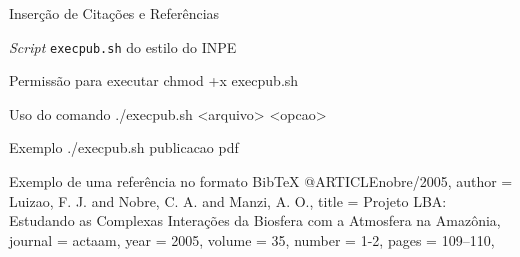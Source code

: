 \documentclass[10pt]{beamer}
\begin{document}
\begin{frame}[fragile]{Inserção de Citações e Referências}
    \begin{block}{\textit{Script} {\tt execpub.sh} do estilo do INPE}
        \vspace{1em}
        \pause
        \begin{meucomandot}{Permissão para executar}
        chmod +x execpub.sh
        \end{meucomandot}
        \pause
        \begin{meucomandot}{Uso do comando}
        ./execpub.sh <arquivo> <opcao>
        \end{meucomandot}    
        \pause
        \begin{meucomandot}{Exemplo}
        ./execpub.sh publicacao pdf
        \end{meucomandot}        
    \end{block}
\end{frame}


\begin{frame}{}
    \begin{meucomandol}{Exemplo de uma referência no formato Bib\TeX{}}
        @ARTICLE{nobre/2005,
          author    = {Luizao, F. J. and Nobre, C. A. and Manzi, A. O.},
          title     = {Projeto LBA: Estudando as Complexas Intera{\c c}\~oes da Biosfera com a Atmosfera na Amaz\^onia},
          journal   = actaam,
          year      = {2005},
          volume    = {35},
          number    = {1-2},
          pages     = {109--110},
        }
    \end{meucomandol}
\end{frame}
\end{document}
